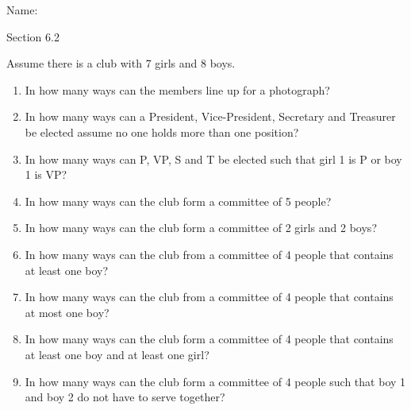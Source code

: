 \documentclass[12pt]{article}
\def\bc{\begin{center}}
\def\ec{\end{center}}
\newcommand{\be}{\begin{enumerate}}
\newcommand{\ee}{\end{enumerate}}
\begin{document}
\thispagestyle{fancy}

\quad
Name: \\

\quad
\bc Section 6.2 \ec

Assume there is a club with 7 girls and 8 boys.
\be
\item In how many ways can the members line up for a photograph?
\vfill
\item In how many ways can a President, Vice-President, Secretary and Treasurer be elected assume no one holds more than one position?
\vfill
\item In how many ways can P, VP, S and T be elected such that girl 1 is P or boy 1 is VP?
\vfill
\item In how many ways can the club form a committee of 5 people?
\vfill
\newpage
\item In how many ways can the club form a committee of 2 girls and 2 boys?
\vfill
\item In how many ways can the club from a committee of 4 people that contains at least one boy?
\vfill
\item In how many ways can the club from a committee of 4 people that contains at most one boy?
\vfill
\item In how many ways can the club form a committee of 4 people that contains at least one boy and at least one girl?
\vfill
\item In how many ways can the club form a committee of 4 people such that boy 1 and boy 2 do not have to serve together?
\vfill
\ee
\end{document}
